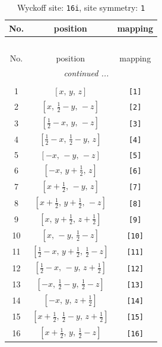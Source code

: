 \documentclass[fleqn,8pt]{jsarticle}
\begin{document}
\begin{longtable}{ccc}
\caption{Wyckoff site: {\tt 16i}, site symmetry: {\tt 1}}
 \\
 \hline \hline
No. & position & mapping \\ \hline \endfirsthead

\multicolumn{2}{l}{\tablename\ \thetable{}} \\
 \hline \hline
No. & position & mapping \\ \hline \endhead

 \hline \hline
\multicolumn{2}{r}{\footnotesize\it continued ...} \\ \endfoot

 \hline \hline
\multicolumn{2}{r}{} \\ \endlastfoot

1 & $\left[ x,\, y,\, z \right]$ & {\tt [1]} \\ \hline
2 & $\left[ x,\, \frac{1}{2} - y,\, - z \right]$ & {\tt [2]} \\ \hline
3 & $\left[ \frac{1}{2} - x,\, y,\, - z \right]$ & {\tt [3]} \\ \hline
4 & $\left[ \frac{1}{2} - x,\, \frac{1}{2} - y,\, z \right]$ & {\tt [4]} \\ \hline
5 & $\left[ - x,\, - y,\, - z \right]$ & {\tt [5]} \\ \hline
6 & $\left[ - x,\, y + \frac{1}{2},\, z \right]$ & {\tt [6]} \\ \hline
7 & $\left[ x + \frac{1}{2},\, - y,\, z \right]$ & {\tt [7]} \\ \hline
8 & $\left[ x + \frac{1}{2},\, y + \frac{1}{2},\, - z \right]$ & {\tt [8]} \\ \hline
9 & $\left[ x,\, y + \frac{1}{2},\, z + \frac{1}{2} \right]$ & {\tt [9]} \\ \hline
10 & $\left[ x,\, - y,\, \frac{1}{2} - z \right]$ & {\tt [10]} \\ \hline
11 & $\left[ \frac{1}{2} - x,\, y + \frac{1}{2},\, \frac{1}{2} - z \right]$ & {\tt [11]} \\ \hline
12 & $\left[ \frac{1}{2} - x,\, - y,\, z + \frac{1}{2} \right]$ & {\tt [12]} \\ \hline
13 & $\left[ - x,\, \frac{1}{2} - y,\, \frac{1}{2} - z \right]$ & {\tt [13]} \\ \hline
14 & $\left[ - x,\, y,\, z + \frac{1}{2} \right]$ & {\tt [14]} \\ \hline
15 & $\left[ x + \frac{1}{2},\, \frac{1}{2} - y,\, z + \frac{1}{2} \right]$ & {\tt [15]} \\ \hline
16 & $\left[ x + \frac{1}{2},\, y,\, \frac{1}{2} - z \right]$ & {\tt [16]} \\
\end{longtable}
\end{document}
